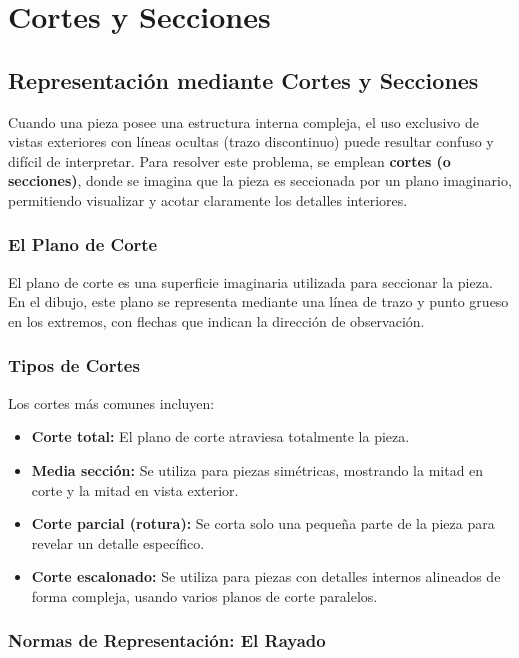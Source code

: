 \chapter{Cortes y Secciones}

\section{Representación mediante Cortes y Secciones}

Cuando una pieza posee una estructura interna compleja, el uso exclusivo
de vistas exteriores con líneas ocultas (trazo discontinuo) puede
resultar confuso y difícil de interpretar. Para resolver este problema,
se emplean \textbf{cortes (o secciones)}, donde se imagina que la pieza
es seccionada por un plano imaginario, permitiendo visualizar y acotar
claramente los detalles interiores.

\subsection{El Plano de Corte}

El plano de corte es una superficie imaginaria utilizada para
seccionar la pieza. En el dibujo, este plano se representa mediante una
línea de trazo y punto grueso en los extremos, con flechas que indican
la dirección de observación.

\subsection{Tipos de Cortes}

Los cortes más comunes incluyen:
\begin{itemize}
	\item \textbf{Corte total:} El plano de corte atraviesa totalmente
	      la pieza.
	\item \textbf{Media sección:} Se utiliza para piezas simétricas,
	      mostrando la mitad en corte y la mitad en vista exterior.
	\item \textbf{Corte parcial (rotura):} Se corta solo una pequeña
	      parte de la pieza para revelar un detalle específico.
	\item \textbf{Corte escalonado:} Se utiliza para piezas con
	      detalles internos alineados de forma compleja, usando
	      varios planos de corte paralelos.
\end{itemize}

\subsection{Normas de Representación: El Rayado}

